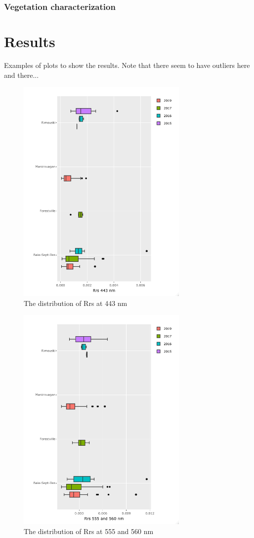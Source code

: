 \documentclass[essd, manuscript]{copernicus}
\begin{document}
\subsubsection{Vegetation characterization}

\section{Results}
Examples of plots to show the results. Note that there seem to have outliers here and there...

\begin{figure}[t]
    \includegraphics[width=8.3cm]{Figures/fig_RRs443_boxplot.png}
    \caption{The distribution of Rrs at 443 nm }
    \label{fig:Rrs443}
\end{figure}

\begin{figure}[t]
    \includegraphics[width=8.3cm]{Figures/fig_Rrs555_boxplot.png}
    \caption{The distribution of Rrs at 555 and 560 nm }
    \label{fig:Rrs555}
\end{figure}
\end{document}
